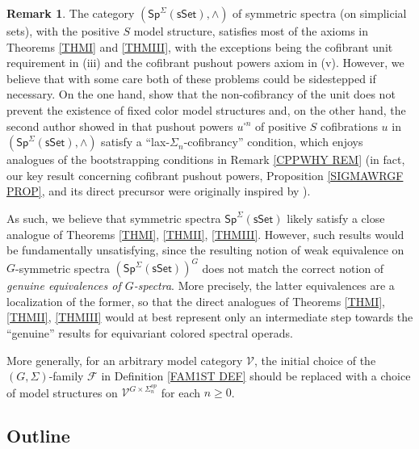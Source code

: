 \documentclass[a4paper,10pt
,draft
]{article}%
\numberwithin{equation}{section}
\numberwithin{figure}{section}
\theoremstyle{definition} %
\newtheorem{remark}[equation]{Remark}%
\newcommand{\F}{\ensuremath{\mathcal F}}
\newcommand{\V}{\ensuremath{\mathcal V}}
\newcommand{\1}{\ensuremath{\mathbbm 1}}%
\begin{document}
\begin{remark}\label{SPNONEX REM}
	The category $(\mathsf{Sp}^{\Sigma}(\mathsf{sSet}),\wedge)$
	of symmetric spectra (on simplicial sets),
	with the positive $S$ model structure,
	satisfies most of the axioms in Theorems 
	\ref{THMI} and \ref{THMIII}, 
	with the exceptions being 
	the cofibrant unit requirement in (iii)
	and the cofibrant pushout powers axiom in (v).
	However, we believe that with some care 
	both of these problems could be sidestepped 
	if necessary. 
	On the one hand, \cite{GV12}
	show that the non-cofibrancy of the unit 
	does not prevent the existence of fixed color model structures
	and, on the other hand, 
	the second author showed in \cite{Pe16}
	that pushout powers $u^{\square n}$ of positive $S$ cofibrations $u$
	in $(\mathsf{Sp}^{\Sigma}(\mathsf{sSet}),\wedge)$
	satisfy a ``lax-$\Sigma_n$-cofibrancy'' condition,
	which enjoys analogues of the bootstrapping conditions
	in Remark \ref{CPPWHY REM}
	(in fact, our key result concerning cofibrant pushout powers,
	Proposition \ref{SIGMAWRGF PROP}, and its direct precursor
	\cite[Prop. 6.24]{BP_geo}
	were originally inspired by \cite[Thm. 1.2]{Pe16}).

	As such, we believe that symmetric spectra
	$\mathsf{Sp}^{\Sigma}(\mathsf{sSet})$
	likely satisfy a close analogue of Theorems 
	\ref{THMI}, \ref{THMII}, \ref{THMIII}.
	However, such results 
	would be fundamentally unsatisfying, 
	since the resulting notion of weak equivalence on
	$G$-symmetric spectra
	$\left(\mathsf{Sp}^{\Sigma}(\mathsf{sSet})\right)^G$
	does not match the correct notion of 
	\emph{genuine equivalences of $G$-spectra}.
	More precisely, the latter equivalences are a localization of the former, so that the direct analogues of 
	Theorems \ref{THMI}, \ref{THMII}, \ref{THMIII}
	would at best represent only an intermediate step
	towards the ``genuine'' results
	for equivariant colored spectral operads.

	More generally,
	for an arbitrary model category $\V$,
	the initial choice of the $(G,\Sigma)$-family $\F$ in  
	Definition \ref{FAM1ST DEF}
	should be replaced with a choice of model structures on
	$\V^{G \times \Sigma_n^{op}}$
	for each $n \geq 0$.	 
\end{remark}



\subsection{Outline}
\end{document}
